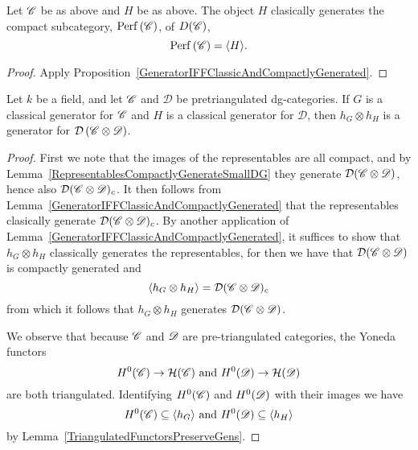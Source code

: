 \documentclass[dissertation.tex]{subfiles}
\begin{document}
\begin{cor}
  Let $\mathscr{C}$ be as above and $H$ be as above.
  The object $H$ clasically generates the compact subcategory, $\operatorname{Perf}\left(\mathscr{C}\right)$, of $D(\mathscr{C})$,
  $$\operatorname{Perf}\left(\mathscr{C}\right) = \langle H \rangle.$$

  \begin{proof}
    Apply Proposition~\ref{GeneratorIFFClassicAndCompactlyGenerated}.
  \end{proof}
\end{cor}

\begin{thm}
  Let $k$ be a field, and let $\mathscr{C}$ and $\mathscr{D}$ be pretriangulated dg-categories.
  If $G$ is a classical generator for $\mathscr{C}$ and $H$ is a classical generator for $\mathscr{D}$, then $h_G \otimes h_H$ is a generator for $\mathcal{D}\left(\mathscr{C} \otimes \mathscr{D}\right)$.
  
  \begin{proof}
    First we note that the images of the representables are all compact, and by Lemma~\ref{RepresentablesCompactlyGenerateSmallDG} they generate $\mathcal{D}(\mathscr{C} \otimes \mathscr{D})$, hence also $\mathcal{D}(\mathscr{C} \otimes \mathscr{D})_c$.
    It then follows from Lemma~\ref{GeneratorIFFClassicAndCompactlyGenerated} that the representables clasically generate $\mathcal{D}(\mathscr{C} \otimes \mathscr{D})_c$.
    By another application of Lemma~\ref{GeneratorIFFClassicAndCompactlyGenerated}, it suffices to show that $h_G \otimes h_H$ classically generates the representables, for then we have that $\mathcal{D}(\mathscr{C} \otimes \mathscr{D})$ is compactly generated and 
    $$\langle h_G \otimes h_H \rangle = \mathcal{D}(\mathscr{C} \otimes \mathscr{D})_c$$
    from which it follows that $h_G \otimes h_H$ generates $\mathcal{D}(\mathscr{C} \otimes \mathscr{D})$.
    
    We observe that because $\mathscr{C}$ and $\mathscr{D}$ are pre-triangulated categories, the Yoneda functors
    $$H^0(\mathscr{C}) \to \mathcal{H}(\mathscr{C})\ \text{and}\ H^0(\mathscr{D}) \to \mathcal{H}(\mathscr{D})$$
    are both triangulated.
    Identifying $H^0(\mathscr{C})$ and $H^0(\mathscr{D})$ with their images we have
    $$H^0(\CC) \subseteq \langle h_G \rangle\ \text{and}\ H^0(\D) \subseteq \langle h_H \rangle$$
    by Lemma~\ref{TriangulatedFunctorsPreserveGens}.
    

\end{proof}
\end{thm}
\end{document}
